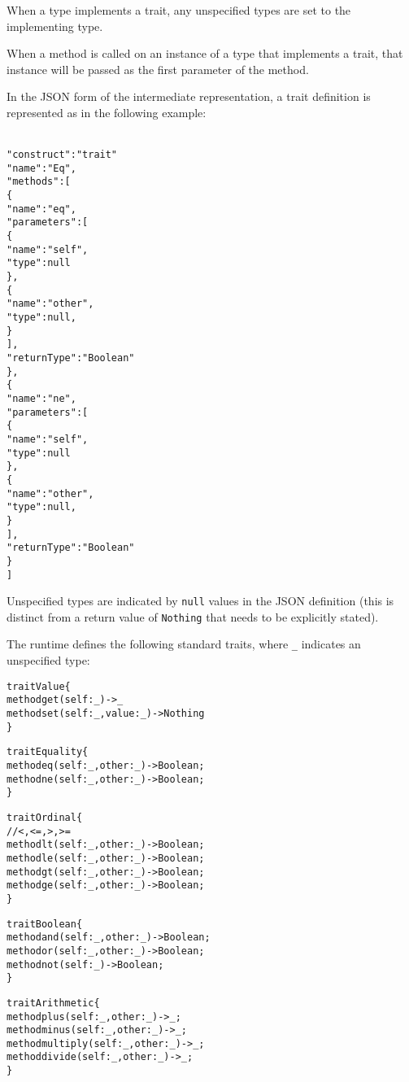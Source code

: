 \documentclass[10pt,twocolumn,a4paper]{article}
\newcommand{\code}[1]{\texttt{#1}}
\begin{document}
When a type implements a trait, any unspecified types are set to the
implementing type.

When a method is called on an instance of a type that implements a trait,
that instance will be passed as the first parameter of the method.

In the JSON form of the intermediate representation, a trait definition is
represented as in the following example:
\footnotesize
\begin{alltt}
  {
    "construct"   : "trait"
    "name"        : "Eq",
    "methods"     : [
      \{
        "name"       : "eq",
        "parameters" : [
          \{
            "name"   : "self",
            "type"   : null
          \},
          \{
            "name"   : "other",
            "type"   : null,
          \}
        ],
        "returnType" : "Boolean"
      \},
      \{
        "name"       : "ne",
        "parameters" : [
          \{
            "name"   : "self",
            "type"   : null
          \},
          \{
            "name"   : "other",
            "type"   : null,
          \}
        ],
        "returnType" : "Boolean"
      \}
    ]
  }
\end{alltt}
\normalsize
Unspecified types are indicated by \code{null} values in the JSON definition
(this is distinct from a return value of \code{Nothing} that needs to be
explicitly stated).

The runtime defines the following standard traits, where \verb|_| indicates
an unspecified type:
\footnotesize
\begin{alltt}
  trait Value \{
    method get(self : \_) -> \_
    method set(self : \_, value : \_) -> Nothing
  \}

  trait Equality \{
    method eq(self : \_, other : \_) -> Boolean;
    method ne(self : \_, other : \_) -> Boolean;
  \}

  trait Ordinal \{
    // <, <=, >, >=
    method lt(self : \_, other : \_) -> Boolean;
    method le(self : \_, other : \_) -> Boolean;
    method gt(self : \_, other : \_) -> Boolean;
    method ge(self : \_, other : \_) -> Boolean;
  \}

  trait Boolean \{
    method and(self : \_, other : \_) -> Boolean;
    method  or(self : \_, other : \_) -> Boolean;
    method not(self : \_) -> Boolean;
  \}

  trait Arithmetic \{
    method     plus(self : \_, other : \_) -> \_;
    method    minus(self : \_, other : \_) -> \_;
    method multiply(self : \_, other : \_) -> \_;
    method   divide(self : \_, other : \_) -> \_;
  \}
\end{alltt}
\normalsize
\end{document}
